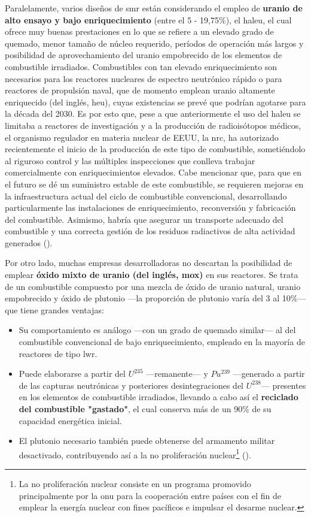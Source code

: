 Paralelamente, varios diseños de \acrshort{smr} están considerando el empleo de \textbf{uranio de alto ensayo y bajo enriquecimiento} (entre el 5 - 19,75\%), el \acrfull{haleu}, el cual ofrece muy buenas prestaciones en lo que se refiere a un elevado grado de quemado, menor tamaño de núcleo requerido, períodos de operación más largos y posibilidad de aprovechamiento del uranio empobrecido de los elementos de combustible irradiados. Combustibles con tan elevado enriquecimiento son necesarios para los reactores nucleares de espectro neutrónico rápido o para reactores de propulsión naval, que de momento emplean uranio altamente enriquecido (del inglés, \acrshort{heu}), cuyas existencias se prevé que podrían agotarse para la década del 2030. Es por esto que, pese a que anteriormente el uso del \acrshort{haleu} se limitaba a reactores de investigación y a la producción de radioisótopos médicos, el organismo regulador en materia nuclear de EEUU, la \acrfull{nrc}, ha autorizado recientemente el inicio de la producción de este tipo de combustible, sometiéndolo al riguroso control y las múltiples inspecciones que conlleva trabajar comercialmente con enriquecimientos elevados.  Cabe mencionar que, para que en el futuro se dé un suministro estable de este combustible, se requieren mejoras en la infraestructura actual del ciclo de combustible convencional, desarrollando particularmente las instalaciones de enriquecimiento, reconversión y fabricación del combustible. Asimismo, habría que asegurar un transporte adecuado del combustible y una correcta gestión de los residuos radiactivos de alta actividad generados (\cite{nrc_haleu}). 

Por otro lado, muchas empresas desarrolladoras no descartan la posibilidad de emplear \textbf{óxido mixto de uranio (del inglés, \acrshort{mox})} en sus reactores. Se trata de un combustible compuesto por una mezcla de óxido de uranio natural, uranio empobrecido y óxido de plutonio ---la proporción de plutonio varía del 3 al 10\%--- que tiene grandes ventajas:

\begin{itemize}
  \item Su comportamiento es análogo ---con un grado de quemado similar--- al del combustible convencional de bajo enriquecimiento, empleado en la mayoría de reactores de tipo \acrshort{lwr}.
  \item Puede elaborarse a partir del $U^{235}$ ---remanente--- y $Pu^{239}$ ---generado a partir de las capturas neutrónicas y posteriores desintegraciones del $U^{238}$--- presentes en los elementos de combustible irradiados, llevando a cabo así el \textbf{reciclado del combustible "gastado"}, el cual conserva más de un 90\% de su capacidad energética inicial. 
  \item El plutonio necesario también puede obtenerse del armamento militar desactivado, contribuyendo así a la \gls{no prolifera}ción nuclear\footnote{La no proliferación nuclear consiste en un programa promovido principalmente por la \acrshort{onu} para la cooperación entre países con el fin de emplear la energía nuclear con fines pacíficos e impulsar el desarme nuclear.} (\cite{wna_mox}).
\end{itemize}

